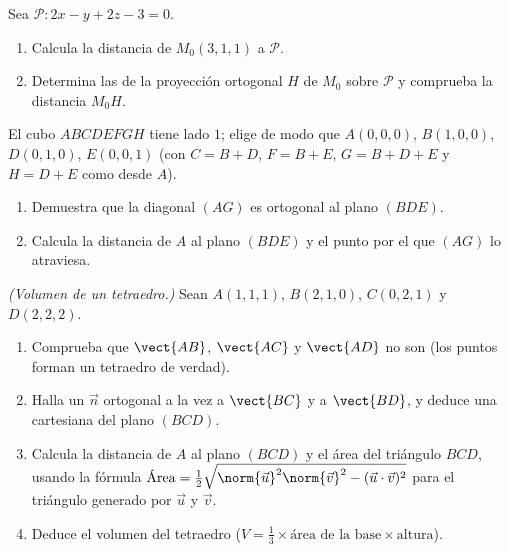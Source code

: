 \begin{exercise}[$\star\star$]\label{exo:g12:space:7}
Sea $\mathcal P : 2x - y + 2z - 3 = 0$.
\begin{enumerate}
  \item Calcula la distancia de $M_0(3, 1, 1)$ a $\mathcal P$.
  \item Determina las  de la proyección ortogonal $H$ de $M_0$
        sobre $\mathcal P$ y comprueba la distancia $M_0H$.
\end{enumerate}
\end{exercise}

\begin{exercise}[$\star\star\star$]\label{exo:g12:space:8}
El cubo $ABCDEFGH$ tiene lado $1$; elige  de modo que
$A(0,0,0)$, $B(1,0,0)$, $D(0,1,0)$, $E(0,0,1)$ (con $C = B + D$,
$F = B + E$, $G = B + D + E$ y $H = D + E$ como  desde $A$).
\begin{enumerate}
  \item Demuestra que la diagonal $(AG)$ es ortogonal al plano $(BDE)$.
  \item Calcula la distancia de $A$ al plano $(BDE)$ y el punto por el que
        $(AG)$ lo atraviesa.
\end{enumerate}
\end{exercise}

\begin{exercise}[$\star\star\star$]\label{exo:g12:space:9}
\emph{(Volumen de un tetraedro.)} Sean $A(1,1,1)$, $B(2,1,0)$, $C(0,2,1)$ y
$D(2,2,2)$.
\begin{enumerate}
  \item Comprueba que $\vect{AB}$, $\vect{AC}$ y $\vect{AD}$ no son
         (los puntos forman un tetraedro de verdad).
  \item Halla un  $\vec n$ ortogonal a la vez a $\vect{BC}$ y a
        $\vect{BD}$, y deduce una  cartesiana del plano $(BCD)$.
  \item Calcula la distancia de $A$ al plano $(BCD)$ y el área del
        triángulo $BCD$, usando la fórmula
        $\text{Área} = \frac12\sqrt{\norm{\vec u}^2\norm{\vec v}^2 -
        (\vec u \cdot \vec v)^2}$ para el triángulo generado por
        $\vec u$ y $\vec v$.
  \item Deduce el volumen del tetraedro
        ($V = \frac13 \times \text{área de la base} \times
        \text{altura}$).
\end{enumerate}
\end{exercise}

